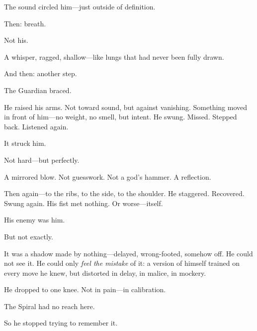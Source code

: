 \documentclass[9pt]{article}
\begin{document}
\vspace{0.5em}
The sound circled him---just outside of definition.

\vspace{0.5em}
Then: breath.

\vspace{0.5em}
Not his.

\vspace{0.5em}
A whisper, ragged, shallow---like lungs that had never been fully drawn.

\vspace{0.5em}
And then: another step.

\vspace{0.5em}
The Guardian braced.

\vspace{0.5em}
He raised his arms. Not toward sound, but against vanishing. Something moved in front of him---no weight, no smell, but intent. He swung. Missed. Stepped back. Listened again.

\vspace{0.5em}
It struck him.

\vspace{0.5em}
Not hard---but perfectly.

\vspace{0.5em}
A mirrored blow. Not guesswork. Not a god’s hammer. A reflection.

\vspace{0.5em}
Then again---to the ribs, to the side, to the shoulder. He staggered. Recovered. Swung again. His fist met nothing. Or worse---itself.

\vspace{0.5em}
His enemy was him.

\vspace{0.5em}
But not exactly.

\vspace{0.5em}
It was a shadow made by nothing---delayed, wrong-footed, somehow off. He could not see it. He could only \textit{feel the mistake} of it: a version of himself trained on every move he knew, but distorted in delay, in malice, in mockery.

\vspace{0.5em}
He dropped to one knee. Not in pain---in calibration.

\vspace{0.5em}
The Spiral had no reach here.

\vspace{0.5em}
So he stopped trying to remember it.
\end{document}
